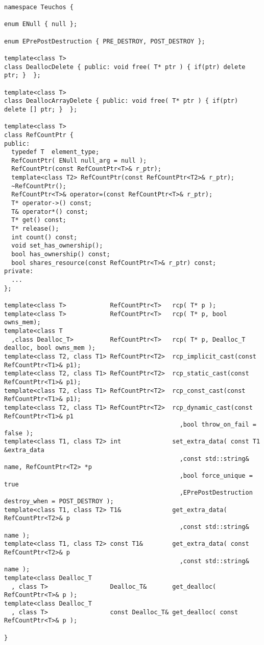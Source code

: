 \documentclass[pdf,ps2pdf,11pt]{SANDreport}
\begin{document}
{\scriptsize\begin{verbatim}
namespace Teuchos {

enum ENull { null };

enum EPrePostDestruction { PRE_DESTROY, POST_DESTROY };

template<class T>
class DeallocDelete { public: void free( T* ptr ) { if(ptr) delete ptr; }  };

template<class T>
class DeallocArrayDelete { public: void free( T* ptr ) { if(ptr) delete [] ptr; }  };

template<class T>
class RefCountPtr {
public:
  typedef T  element_type;
  RefCountPtr( ENull null_arg = null );
  RefCountPtr(const RefCountPtr<T>& r_ptr);
  template<class T2> RefCountPtr(const RefCountPtr<T2>& r_ptr);
  ~RefCountPtr();
  RefCountPtr<T>& operator=(const RefCountPtr<T>& r_ptr);
  T* operator->() const;
  T& operator*() const;
  T* get() const;
  T* release();
  int count() const;
  void set_has_ownership();
  bool has_ownership() const;
  bool shares_resource(const RefCountPtr<T>& r_ptr) const;
private:
  ...
};

template<class T>            RefCountPtr<T>   rcp( T* p );
template<class T>            RefCountPtr<T>   rcp( T* p, bool owns_mem);
template<class T
  ,class Dealloc_T>          RefCountPtr<T>   rcp( T* p, Dealloc_T dealloc, bool owns_mem );
template<class T2, class T1> RefCountPtr<T2>  rcp_implicit_cast(const RefCountPtr<T1>& p1);
template<class T2, class T1> RefCountPtr<T2>  rcp_static_cast(const RefCountPtr<T1>& p1);
template<class T2, class T1> RefCountPtr<T2>  rcp_const_cast(const RefCountPtr<T1>& p1);
template<class T2, class T1> RefCountPtr<T2>  rcp_dynamic_cast(const RefCountPtr<T1>& p1
                                                ,bool throw_on_fail = false );
template<class T1, class T2> int              set_extra_data( const T1 &extra_data
                                                ,const std::string& name, RefCountPtr<T2> *p
                                                ,bool force_unique = true
                                                ,EPrePostDestruction destroy_when = POST_DESTROY );
template<class T1, class T2> T1&              get_extra_data( RefCountPtr<T2>& p
                                                ,const std::string& name );
template<class T1, class T2> const T1&        get_extra_data( const RefCountPtr<T2>& p
                                                ,const std::string& name );
template<class Dealloc_T
  , class T>                 Dealloc_T&       get_dealloc( RefCountPtr<T>& p );
template<class Dealloc_T
  , class T>                 const Dealloc_T& get_dealloc( const RefCountPtr<T>& p );

}
\end{verbatim}}
\end{document}
